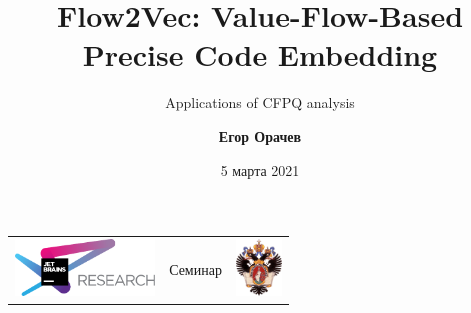 \documentclass[xcolor=table,english]{beamer}
\title[Flow2Vec]{Flow2Vec: Value-Flow-Based Precise Code Embedding}
\subtitle[YaccConstructor]{Applications of CFPQ analysis}
\institute[СПбГУ]{
JetBrains Research, Лаборатория языковых инструментов  \\
Санкт-Петербургский Государственный университет
}
\author[Егор Орачев]{\textbf{Егор Орачев}}
\date{5 марта 2021}
\begin{document}
{
\begin{frame}[fragile]
  \begin{table}
  \centering
  \begin{tabularx}{\linewidth}{YcX}
    \includegraphics[height=1.5cm]{pictures/jetbrainsResearch.pdf} \hfill
    & \begin{minipage}[t]{0.3\textwidth}\center \vspace{-1cm}  Семинар
      \end{minipage}
    & \hfill \includegraphics[height=1.5cm]{pictures/SPbGU_Logo.png}
  \end{tabularx}
  \end{table}
  \titlepage
\end{frame}
}
\end{document}
